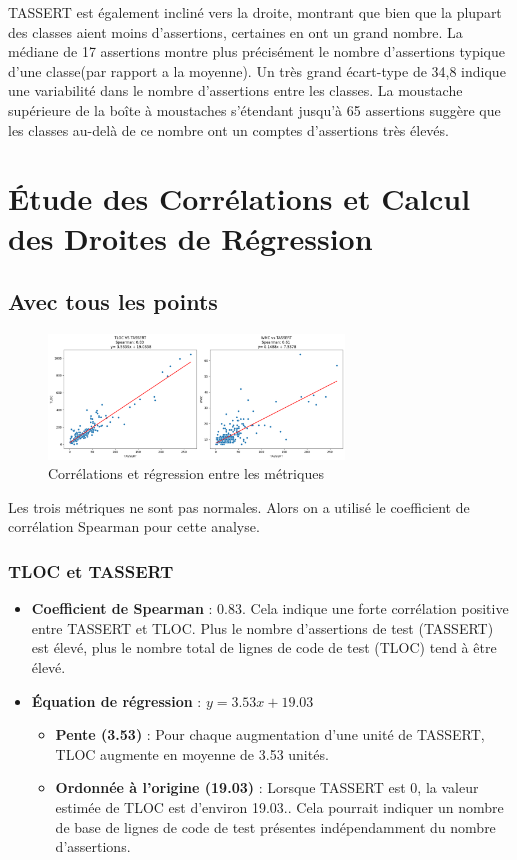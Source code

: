 \documentclass[10pt]{article}
\begin{document}
TASSERT est également incliné vers la droite, montrant que bien que la plupart des classes aient moins d'assertions, certaines en ont un grand nombre. La médiane de 17 assertions montre plus précisément le nombre d'assertions typique d'une classe(par rapport a la moyenne). Un très grand écart-type de 34,8 indique une variabilité dans le nombre d'assertions entre les classes. La moustache supérieure de la boîte à moustaches s'étendant jusqu'à 65 assertions suggère que les classes au-delà de ce nombre ont un comptes d'assertions très élevés.




\section{Étude des Corrélations et Calcul des Droites de Régression}


\subsection{Avec tous les points}
\begin{figure}[h]
\centering
\includegraphics[width=0.7\textwidth]{correlations.png}
\caption{Corrélations et régression entre les métriques}
\end{figure}

Les trois métriques ne sont pas normales. Alors on a utilisé le coefficient de corrélation Spearman pour cette analyse.

\subsubsection{TLOC et TASSERT}
\begin{itemize}
    \item \textbf{Coefficient de Spearman} : 0.83. Cela indique une forte corrélation positive entre TASSERT et TLOC. Plus le nombre d'assertions de test (TASSERT) est élevé, plus le nombre total de lignes de code de test (TLOC) tend à être élevé.
    \item \textbf{Équation de régression} : \( y = 3.53x + 19.03 \) 
    \begin{itemize}
        \item \textbf{Pente (3.53)} : Pour chaque augmentation d'une unité de TASSERT, TLOC augmente en moyenne de 3.53 unités.
        \item \textbf{Ordonnée à l'origine (19.03)} : Lorsque TASSERT est 0, la valeur estimée de TLOC est d'environ 19.03.. Cela pourrait indiquer un nombre de base de lignes de code de test présentes indépendamment du nombre d'assertions.
    \end{itemize}
\end{itemize}
\end{document}
